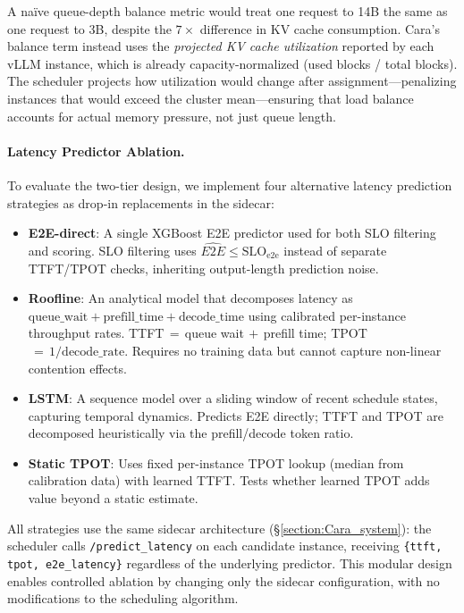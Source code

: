 \documentclass[letterpaper, anonymous, twocolumn, 10pt]{article}
\begin{document}
A na\"ive queue-depth balance metric would treat one request to 14B the same as one request to 3B, despite the $7\times$ difference in KV cache consumption.
Cara's balance term instead uses the \emph{projected KV cache utilization} reported by each vLLM instance, which is already capacity-normalized (used blocks / total blocks).
The scheduler projects how utilization would change after assignment---penalizing instances that would exceed the cluster mean---ensuring that load balance accounts for actual memory pressure, not just queue length.

\paragraph{Latency Predictor Ablation.}
To evaluate the two-tier design, we implement four alternative latency prediction strategies as drop-in replacements in the sidecar:
\begin{itemize}
    \item \textbf{E2E-direct}: A single XGBoost E2E predictor used for both SLO filtering and scoring. SLO filtering uses $\hat{E2E} \leq \text{SLO}_{\text{e2e}}$ instead of separate TTFT/TPOT checks, inheriting output-length prediction noise.
    \item \textbf{Roofline}: An analytical model that decomposes latency as $\text{queue\_wait} + \text{prefill\_time} + \text{decode\_time}$ using calibrated per-instance throughput rates. TTFT$\,=\,$queue wait$\,+\,$prefill time; TPOT$\,=\,1/\text{decode\_rate}$. Requires no training data but cannot capture non-linear contention effects.
    \item \textbf{LSTM}: A sequence model over a sliding window of recent schedule states, capturing temporal dynamics. Predicts E2E directly; TTFT and TPOT are decomposed heuristically via the prefill/decode token ratio.
    \item \textbf{Static TPOT}: Uses fixed per-instance TPOT lookup (median from calibration data) with learned TTFT. Tests whether learned TPOT adds value beyond a static estimate.
\end{itemize}
All strategies use the same sidecar architecture (\S\ref{section:Cara_system}): the scheduler calls \texttt{/predict\_latency} on each candidate instance, receiving \texttt{\{ttft, tpot, e2e\_latency\}} regardless of the underlying predictor.
This modular design enables controlled ablation by changing only the sidecar configuration, with no modifications to the scheduling algorithm.
\end{document}
